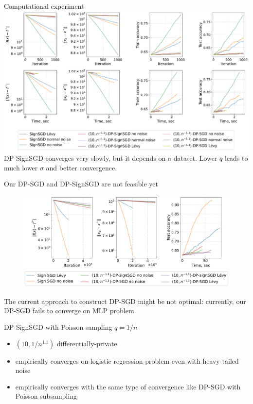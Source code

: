 \documentclass{beamer}
\begin{document}
\begin{frame}{Computational experiment}
    \includegraphics[width=1.0\textwidth]{v100K/long/v100K_long.pdf} 
DP-SignSGD converges very slowly, but it depends on a dataset. Lower $q$ leads to much lower $\sigma$ and better convergence.
\end{frame}
\begin{frame}{Our DP-SGD and DP-SignSGD are not feasible yet}
    \begin{figure}
        \centering
        \includegraphics[width=1\textwidth]{v28_10eps_short.pdf}
    \end{figure}
    The current approach to construct DP-SGD might be not optimal: currently, our DP-SGD fails to converge on MLP problem.
\end{frame}
\begin{frame}{DP-SignSGD with Poisson sampling $q = 1/n$}
    \begin{itemize}
        \item $(10, 1/n^{1.1})$ differentially-private
        \item empirically converges on logistic regression problem even with heavy-tailed noise
        \item empirically converges with the same type of convergence like DP-SGD with Poisson subsampling
    \end{itemize}
\end{frame}
\end{document}
